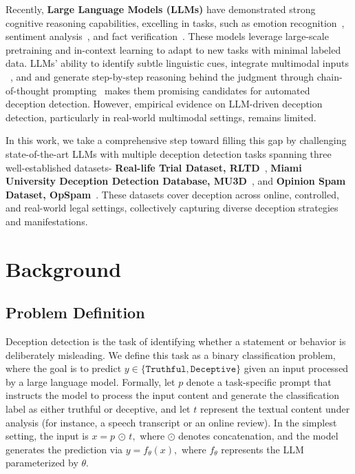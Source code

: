Recently, \textbf{Large Language Models (LLMs)} have demonstrated strong cognitive reasoning capabilities, excelling in tasks, such as emotion recognition~\cite{NEURIPS2024_c7f43ada, INSTERC, zhang-etal-2024-visual}, sentiment analysis~\cite{zhang-etal-2024-sentiment}, and fact verification~\cite{zhang-gao-2023-towards}. These models leverage large-scale pretraining and in-context learning to adapt to new tasks with minimal labeled data. LLMs’ ability to identify subtle linguistic cues, integrate multimodal inputs ~\cite{Chu2023QwenAudioAU, liu2023llava, zhang-etal-2023-video}, and and generate step-by-step reasoning behind the judgment through chain-of-thought prompting~\cite{cot} makes them promising candidates for automated deception detection. However, empirical evidence on LLM-driven deception detection, particularly in real-world multimodal settings, remains limited.

In this work, we take a comprehensive step toward filling this gap by challenging state-of-the-art LLMs with multiple deception detection tasks spanning three well-established datasets- \textbf{Real-life Trial Dataset, RLTD}~\cite{rltd}, \textbf{Miami University Deception Detection Database, MU3D}~\cite{mu3d}, and \textbf{Opinion Spam Dataset, OpSpam}~\cite{opspam}. These datasets cover deception across online, controlled, and real-world legal settings, collectively capturing diverse deception strategies and manifestations.

\section{Background}

\subsection{Problem Definition}

Deception detection is the task of identifying whether a statement or behavior is deliberately misleading. We define this task as a binary classification problem, where the goal is to predict \( y \in \{\texttt{Truthful}, \texttt{Deceptive}\} \) given an input processed by a large language model. Formally, let \( p \) denote a task-specific prompt that instructs the model to process the input content and generate the classification label as either truthful or deceptive, and let \( t \) represent the textual content under analysis (for instance, a speech transcript or an online review). In the simplest setting, the input is
\(
x = p \,\odot\, t,
\)
where \(\odot\) denotes concatenation, and the model generates the prediction via
\(
y = f_\theta(x),
\)
where $f_\theta$ represents the LLM parameterized by $\theta$. 

